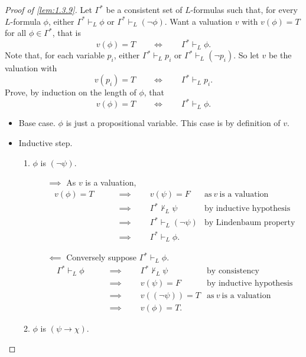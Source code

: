 \documentclass{article}
\newcommand{\rb}[1]{\left( #1 \right)}
\newcommand{\notb}[1]{\rb{\neg #1}}
\newcommand{\impb}[2]{\rb{#1 \rightarrow #2}}
\theoremstyle{definition}\newtheorem{definition}{Definition}[subsection]
\theoremstyle{definition}\newtheorem{remark1}[definition]{Remark}
\theoremstyle{definition}\newtheorem{example1}[definition]{Example}
\theoremstyle{definition}\newtheorem*{remark2}{Remark}
\theoremstyle{definition}\newtheorem*{example2}{Example}
\theoremstyle{definition}\newtheorem*{note}{Note}
\theoremstyle{definition}\newtheorem*{notation}{Notation}
\begin{document}
\begin{proof}[Proof of \ref{lem:1.3.9}]
Let $ \Gamma^* $ be a consistent set of $ L $-formulas such that, for every $ L $-formula $ \phi $, either $ \Gamma^* \vdash_L \phi $ or $ \Gamma^* \vdash_L \notb{\phi} $. Want a valuation $ v $ with $ v\rb{\phi} = T $ for all $ \phi \in \Gamma^* $, that is
$$ v\rb{\phi} = T \qquad \iff \qquad \Gamma^* \vdash_L \phi. $$
Note that, for each variable $ p_i $, either $ \Gamma^* \vdash_L p_i $ or $ \Gamma^* \vdash_L \notb{p_i} $. So let $ v $ be the valuation with
$$ v\rb{p_i} = T \qquad \iff \qquad \Gamma^* \vdash_L p_i. $$
Prove, by induction on the length of $ \phi $, that
$$ v\rb{\phi} = T \qquad \iff \qquad \Gamma^* \vdash_L \phi. $$
\begin{itemize}
\item Base case. $ \phi $ is just a propositional variable. This case is by definition of $ v $.
\item Inductive step.
\begin{enumerate}[leftmargin=0.5in, label=Case \arabic*.]
\item $ \phi $ is $ \notb{\psi} $.
\begin{itemize}
\item[$ \implies $] As $ v $ is a valuation,
\begin{align*}
v\rb{\phi} = T \qquad
& \implies \qquad v\rb{\psi} = F & \text{as} \ v \ \text{is a valuation} \\
& \implies \qquad \Gamma^* \not\vdash_L \psi & \text{by inductive hypothesis} \\
& \implies \qquad \Gamma^* \vdash_L \notb{\psi} & \text{by Lindenbaum property} \\
& \implies \qquad \Gamma^* \vdash_L \phi.
\end{align*}
\item[$ \impliedby $] Conversely suppose $ \Gamma^* \vdash_L \phi $.
\begin{align*}
\Gamma^* \vdash_L \phi \qquad
& \implies \qquad \Gamma^* \not\vdash_L \psi & \text{by consistency} \\
& \implies \qquad v\rb{\psi} = F & \text{by inductive hypothesis} \\
& \implies \qquad v\rb{\notb{\psi}} = T & \text{as} \ v \ \text{is a valuation} \\
& \implies \qquad v\rb{\phi} = T.
\end{align*}
\pagebreak
\end{itemize}
\item $ \phi $ is $ \impb{\psi}{\chi} $.
\begin{itemize}

\end{itemize}
\end{enumerate}
\end{itemize}
\end{proof}
\end{document}
